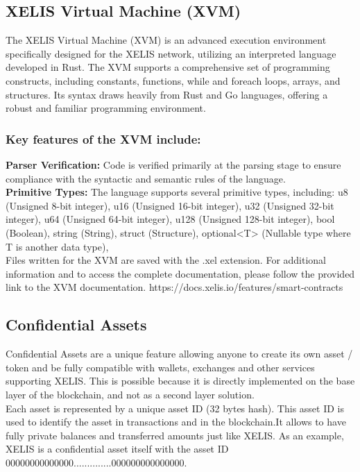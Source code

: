 \documentclass[12pt,a4paper,twocolumn]{article}
\begin{document}
\subsection{XELIS Virtual Machine (XVM)}

The XELIS Virtual Machine (XVM) is an advanced execution environment specifically designed for the XELIS network, utilizing an interpreted language developed in Rust. The XVM supports a comprehensive set of programming constructs, including constants, functions, while and foreach loops, arrays, and structures. Its syntax draws heavily from Rust and Go languages, offering a robust and familiar programming environment.\\

\subsubsection{Key features of the XVM include:}

\textbf{Parser Verification:} Code is verified primarily at the parsing stage to ensure compliance with the syntactic and semantic rules of the language.\\

\textbf{Primitive Types:} The language supports several primitive types, including:
u8 (Unsigned 8-bit integer),
u16 (Unsigned 16-bit integer),
u32 (Unsigned 32-bit integer),
u64 (Unsigned 64-bit integer),
u128 (Unsigned 128-bit integer),
bool (Boolean),
string (String),
struct (Structure),
optional<T> (Nullable type where T is another data type),\\

Files written for the XVM are saved with the .xel extension. For additional information and to access the complete documentation, please follow the provided link to the XVM documentation. https://docs.xelis.io/features/smart-contracts 

\subsection{Confidential Assets}

Confidential Assets are a unique feature allowing anyone to create its own asset / token and be fully compatible with wallets, exchanges and other services supporting XELIS. This is possible because it is directly implemented on the base layer of the blockchain, and not as a second layer solution.\\

Each asset is represented by a unique asset ID (32 bytes hash). This asset ID is used to identify the asset in transactions and in the blockchain.It allows to have fully private balances and transferred amounts just like XELIS. As an example, XELIS is a confidential asset itself with the asset ID 00000000000000..............000000000000000.\\
\end{document}
